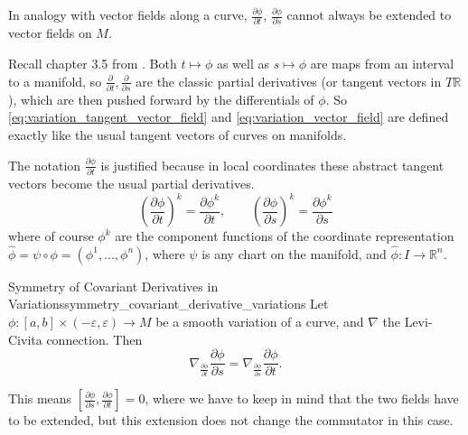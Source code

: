 In analogy with vector fields along a curve, $\frac{\partial \phi}{\partial t}$, $\frac{\partial \phi}{\partial s}$ cannot always be extended to vector fields on $M$.

\begin{colremark}
    Recall chapter 3.5 from \cite{tsakanikas2024dg2}. Both $t\mapsto \phi$ as well as $s\mapsto \phi$ are maps from an interval to a manifold, so $\frac{\partial}{\partial t},\frac{\partial}{\partial s}$ are the classic partial derivatives (or tangent vectors in $T \mathbb{R}$), which are then pushed forward by the differentials of $\phi$. So \eqref{eq:variation_tangent_vector_field} and \eqref{eq:variation_vector_field} are defined exactly like the usual tangent vectors of curves on manifolds.
    
    The notation $\frac{\partial \phi}{\partial t}$ is justified because in local coordinates these abstract tangent vectors become the usual partial derivatives.
    \[
    \left(\frac{\partial \phi}{\partial t}\right)^k = \frac{\partial \phi^k}{\partial t}, \qquad \left(\frac{\partial \phi}{\partial s}\right)^k = \frac{\partial \phi^k}{\partial s}
    \]
    where of course $\phi^k$ are the component functions of the coordinate representation $\widehat{\phi}=\psi\circ\phi = (\phi^1,...,\phi^n)$, where $\psi$ is any chart on the manifold, and $\widehat{\phi}:I\to \mathbb{R}^n$.
\end{colremark}



\begin{colorlem}{Symmetry of Covariant Derivatives in Variations}{symmetry_covariant_derivative_variations}
Let $\phi: [a,b] \times (-\varepsilon, \varepsilon) \to M$ be a smooth variation of a curve, and $\nabla$ the Levi-Civita connection. Then
\[
\nabla_{\frac{\partial \phi}{\partial t}} \frac{\partial \phi}{\partial s} = \nabla_{\frac{\partial \phi}{\partial s}} \frac{\partial \phi}{\partial t}.
\]
\end{colorlem}

This means $\left[\frac{\partial \phi}{\partial s},\frac{\partial \phi}{\partial t}\right]=0$, where we have to keep in mind that the two fields have to be extended, but this extension does not change the commutator in this case.

